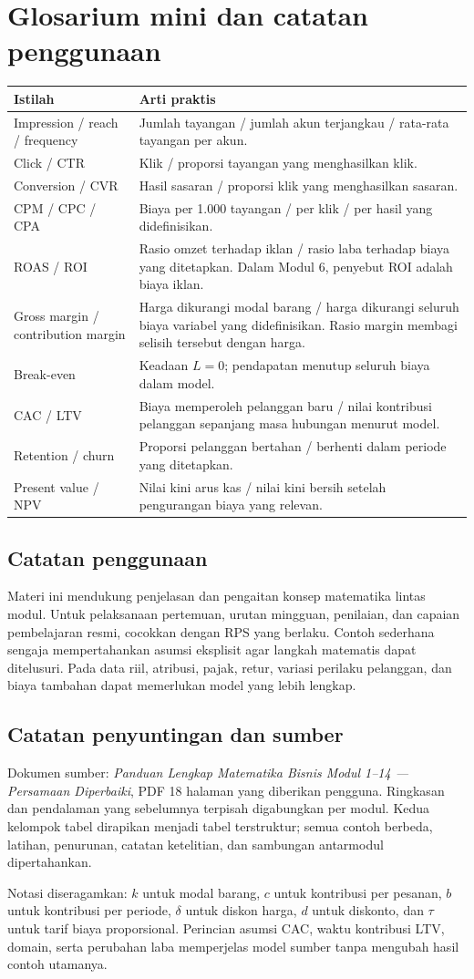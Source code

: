 \documentclass[11pt,a4paper]{article}
\newcommand{\bagian}[1]{\Needspace{5\baselineskip}\subsection{#1}}
\begin{document}
\section{Glosarium mini dan catatan penggunaan}
\begin{longtable}{@{}>{\raggedright\arraybackslash}p{52mm}>{\raggedright\arraybackslash}p{98mm}@{}}
\toprule\textbf{Istilah}&\textbf{Arti praktis}\\\midrule\endhead
Impression / reach / frequency&Jumlah tayangan / jumlah akun terjangkau / rata-rata tayangan per akun.\\
Click / CTR&Klik / proporsi tayangan yang menghasilkan klik.\\
Conversion / CVR&Hasil sasaran / proporsi klik yang menghasilkan sasaran.\\
CPM / CPC / CPA&Biaya per 1.000 tayangan / per klik / per hasil yang didefinisikan.\\
ROAS / ROI&Rasio omzet terhadap iklan / rasio laba terhadap biaya yang ditetapkan. Dalam Modul 6, penyebut ROI adalah biaya iklan.\\
Gross margin / contribution margin&Harga dikurangi modal barang / harga dikurangi seluruh biaya variabel yang didefinisikan. Rasio margin membagi selisih tersebut dengan harga.\\
Break-even&Keadaan \(L=0\); pendapatan menutup seluruh biaya dalam model.\\
CAC / LTV&Biaya memperoleh pelanggan baru / nilai kontribusi pelanggan sepanjang masa hubungan menurut model.\\
Retention / churn&Proporsi pelanggan bertahan / berhenti dalam periode yang ditetapkan.\\
Present value / NPV&Nilai kini arus kas / nilai kini bersih setelah pengurangan biaya yang relevan.\\
\bottomrule
\end{longtable}
\bagian{Catatan penggunaan}
Materi ini mendukung penjelasan dan pengaitan konsep matematika lintas modul. Untuk pelaksanaan pertemuan, urutan mingguan, penilaian, dan capaian pembelajaran resmi, cocokkan dengan RPS yang berlaku. Contoh sederhana sengaja mempertahankan asumsi eksplisit agar langkah matematis dapat ditelusuri. Pada data riil, atribusi, pajak, retur, variasi perilaku pelanggan, dan biaya tambahan dapat memerlukan model yang lebih lengkap.

\bagian{Catatan penyuntingan dan sumber}
Dokumen sumber: \emph{Panduan Lengkap Matematika Bisnis Modul 1--14 --- Persamaan Diperbaiki}, PDF 18 halaman yang diberikan pengguna. Ringkasan dan pendalaman yang sebelumnya terpisah digabungkan per modul. Kedua kelompok tabel dirapikan menjadi tabel terstruktur; semua contoh berbeda, latihan, penurunan, catatan ketelitian, dan sambungan antarmodul dipertahankan.

Notasi diseragamkan: \(k\) untuk modal barang, \(c\) untuk kontribusi per pesanan, \(b\) untuk kontribusi per periode, \(\delta\) untuk diskon harga, \(d\) untuk diskonto, dan \(\tau\) untuk tarif biaya proporsional. Perincian asumsi CAC, waktu kontribusi LTV, domain, serta perubahan laba memperjelas model sumber tanpa mengubah hasil contoh utamanya.
\end{document}
